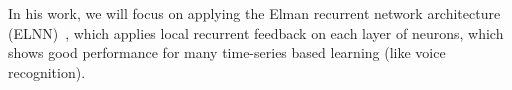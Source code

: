 %
In his work, we will focus on applying the Elman recurrent network
architecture (ELNN)~\cite{elman1990finding}, which applies local
recurrent feedback on each layer of neurons, which shows good
performance for many time-series based learning (like voice
recognition).
%
%

